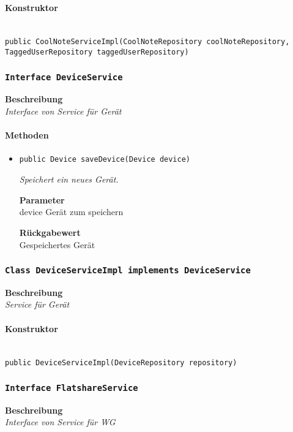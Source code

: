      \paragraph*{Konstruktor}\mbox{} \\
     \texttt{public CoolNoteServiceImpl(CoolNoteRepository coolNoteRepository, TaggedUserRepository taggedUserRepository)} \\
     \subsubsection{\texttt{Interface DeviceService}}
     \textbf{Beschreibung} \\
     \textit{Interface von Service für Gerät}
     \paragraph*{Methoden}
     \begin{itemize}
     	\item{\texttt{public Device saveDevice(Device device)}}
     	
     	\textit{Speichert ein neues Gerät.}
     	
     	\textbf{Parameter} \\
     	device Gerät zum speichern
     	
     	\textbf{Rückgabewert} \\
     	Gespeichertes Gerät
     \end{itemize}
     \subsubsection{\texttt{Class DeviceServiceImpl implements DeviceService}}
     \textbf{Beschreibung} \\
     \textit{Service für Gerät}
     \paragraph*{Konstruktor}\mbox{} \\
     \texttt{public DeviceServiceImpl(DeviceRepository repository)} \\
     \subsubsection{\texttt{Interface FlatshareService}}
     \textbf{Beschreibung} \\
     \textit{Interface von Service für WG}
